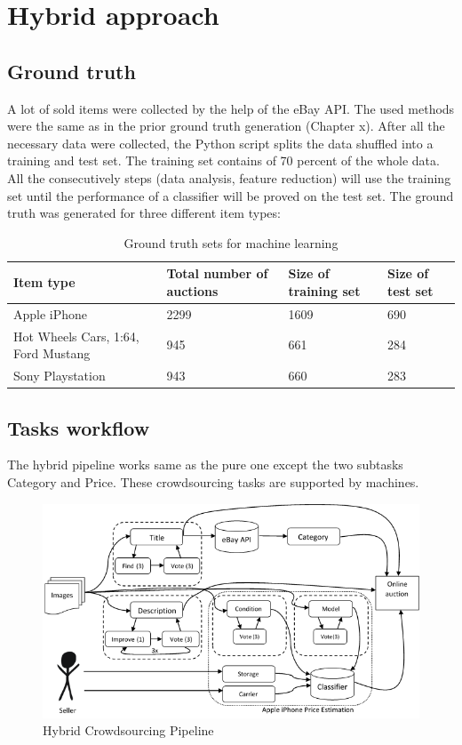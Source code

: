 \section{Hybrid approach}
\subsection{Ground truth}
A lot of sold items were collected by the help of the eBay API. The used methods were the same as in the prior ground truth generation (Chapter x). After all the necessary data were collected, the Python script splits the data shuffled into a training and test set. The training set contains of 70 percent of the whole data. All the consecutively steps (data analysis, feature reduction) will use the training set until the performance of a classifier will be proved on the test set. The ground truth was generated for three different item types:
\begin{table}[h!]
	\begin{center}
	\begin{tabular}{| p{3.25cm} | p{3.25cm} | p{3.25cm} | p{3.25cm} |}
		\hline
		Item type & Total number of auctions & Size of training set & Size of test set \\
		\hline
		Apple iPhone & 2299 & 1609 & 690 \\
		\hline
		Hot Wheels Cars, 1:64, Ford Mustang & 945 & 661 & 284 \\
		\hline
		Sony Playstation & 943 & 660 & 283 \\
		\hline
	\end{tabular}
	\end{center}
	\caption{Ground truth sets for machine learning}
\end{table}
\subsection{Tasks workflow}
The hybrid pipeline works same as the pure one except the two subtasks Category and Price. These crowdsourcing tasks are supported by machines.
\begin{figure}[h!]
\centering
\includegraphics[scale=0.8]{images/pipelines/Hybrid_Pipeline.png}
\caption{Hybrid Crowdsourcing Pipeline}
\label{purePipeline}
\end{figure}
